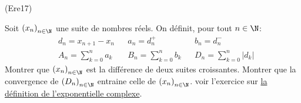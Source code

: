 \begin{tiny}(Ere17)\end{tiny} Soit $\left( x_n\right) _{n\in \N}$ une suite de nombres réels. On définit, pour tout $n\in \N$:
\begin{align*}
 &d_n = x_{n+1} - x_n &
 &a_n = d_n^+ &
 &b_n = d_n^- \\
 &A_n = \sum_{k=0}^n a_k &
 &B_n = \sum_{k=0}^n b_k &
 &D_n = \sum_{k=0}^n |d_k|
\end{align*}
Montrer que $\left( x_n\right) _{n\in \N}$ est la différence de deux suites croissantes. Montrer que la convergence de $\left( D_n\right) _{n\in \N}$ entraine celle de $\left( x_n\right) _{n\in \N}$.\newline
voir l'exercice sur \href{http://back.maquisdoc.net/v-1/index.php?act=chelt&id_elt=4860}{la définition de l'exponentielle complexe}.